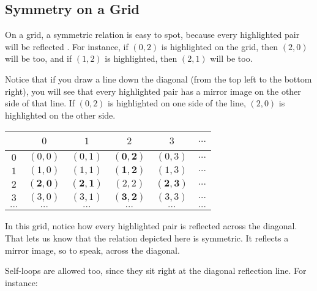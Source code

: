 \documentclass[../../../main.tex]{subfiles}
\begin{document}
\subsection{Symmetry on a Grid}

On a grid, a symmetric relation is easy to spot, because every highlighted pair will be reflected . For instance, if $(0, 2)$ is highlighted on the grid, then $(2, 0)$ will be too, and if $(1, 2)$ is highlighted, then $(2, 1)$ will be too.

\begin{aside}
  \begin{remark}
    Notice that if you draw a line down the diagonal (from the top left to the bottom right), you will see that every highlighted pair has a mirror image on the other side of that line. If $(0, 2)$ is highlighted on one side of the line, $(2, 0)$ is highlighted on the other side.
  \end{remark}
\end{aside}

\begin{center}
  \begin{tabular}{| c | c | c | c | c | c |}
    \hline
    ~   & $0$      & $1$      & $2$      & $3$      & $\ldots$ \\ \hline
    $0$ & $(0, 0)$ & $(0, 1)$ & \textcolor{vocabcolor}{$\mathbf{(0, 2)}$} & $(0, 3)$ & $\ldots$ \\ \hline
    $1$ & $(1, 0)$ & $(1, 1)$ & \textcolor{vocabcolor}{$\mathbf{(1, 2)}$} & $(1, 3)$ & $\ldots$ \\ \hline
    $2$ & \textcolor{vocabcolor}{$\mathbf{(2, 0)}$} & \textcolor{vocabcolor}{$\mathbf{(2, 1)}$} & $(2, 2)$ & \textcolor{vocabcolor}{$\mathbf{(2, 3)}$} & $\ldots$ \\ \hline
    $3$ & $(3, 0)$ & $(3, 1)$ & \textcolor{vocabcolor}{$\mathbf{(3, 2)}$} & $(3, 3)$ & $\ldots$ \\ \hline
    $\ldots$ & $\ldots$ & $\ldots$ & $\ldots$ & $\ldots$ & $\ldots$ \\ \hline                
  \end{tabular}
\end{center}

In this grid, notice how every highlighted pair is reflected across the diagonal. That lets us know that the relation depicted here is symmetric. It reflects a mirror image, so to speak, across the diagonal.

Self-loops are allowed too, since they sit right at the diagonal reflection line. For instance:
\end{document}
